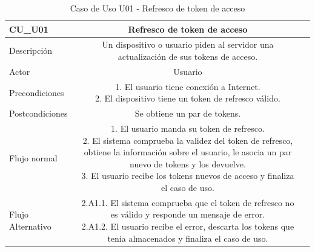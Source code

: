 \begin{table}[H]
\centering
	\setlength{\extrarowheight}{3pt}
		\begin{tabular}{rc{1.85cm}|c{8cm}}
	    \hline
        \multicolumn{1}{|l}{CU_U01}     & \multicolumn{1}{Y|}{\textbf{Refresco de token de acceso}  } \\
	    \hline \hline
	    \multicolumn{1}{|l}{Descripción}     & \multicolumn{1}{Y|}{
	    Un dispositivo o usuario piden al servidor una actualización de sus tokens de acceso.
	    }  \\ \cline{1-2}
	    \multicolumn{1}{|l}{Actor}           & \multicolumn{1}{Y|}{Usuario}  \\ \cline{1-2}
	    \multicolumn{1}{|l}{Precondiciones}  & \multicolumn{1}{Y|}{
1. El usuario tiene conexión a Internet.\newline
2. El dispositivo tiene un token de refresco válido.}  \\ \cline{1-2}
	    \multicolumn{1}{|l}{Postcondiciones} & \multicolumn{1}{Y|}{Se obtiene un par de tokens.}\\ \cline{1-2}
	    \multicolumn{1}{|l}{Flujo normal}    & \multicolumn{1}{Y|}{
1. El usuario manda su token de refresco. \newline
2. El sistema comprueba la validez del token de refresco, obtiene la información sobre el usuario, le asocia un par nuevo de tokens y los devuelve. \newline
3. El usuario recibe los tokens nuevos de acceso y finaliza el caso de uso.
	    } \\ \cline{1-2}
	    \multicolumn{1}{|l}{Flujo Alternativo} & \multicolumn{1}{Y|}{
2.A1.1. El sistema comprueba que el token de refresco no es válido y responde un mensaje de error. \newline
2.A1.2. El usuario recibe el error, descarta los tokens que tenía almacenados y finaliza el caso de uso.
}\\ \cline{1-2}
	    \hline
	    \end{tabular}
	\label{table:cu_u01}
	\caption{Caso de Uso U01 - Refresco de token de acceso}
\end{table}



